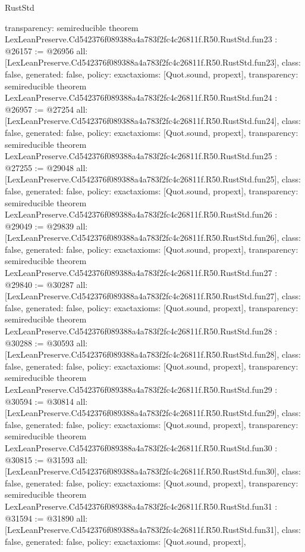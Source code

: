 \begin{lexlean}{RustStd}
\begin{coremodule}
{  transparency: semireducible
}
theorem LexLeanPreserve.Cd542376f089388a4a783f2fc4c26811f.R50.RustStd.fun23 : @26157 := @26956 {
  all: [LexLeanPreserve.Cd542376f089388a4a783f2fc4c26811f.R50.RustStd.fun23],
  class: false,
  generated: false,
  policy: exact{axioms: [Quot.sound, propext]},
  transparency: semireducible
}
theorem LexLeanPreserve.Cd542376f089388a4a783f2fc4c26811f.R50.RustStd.fun24 : @26957 := @27254 {
  all: [LexLeanPreserve.Cd542376f089388a4a783f2fc4c26811f.R50.RustStd.fun24],
  class: false,
  generated: false,
  policy: exact{axioms: [Quot.sound, propext]},
  transparency: semireducible
}
theorem LexLeanPreserve.Cd542376f089388a4a783f2fc4c26811f.R50.RustStd.fun25 : @27255 := @29048 {
  all: [LexLeanPreserve.Cd542376f089388a4a783f2fc4c26811f.R50.RustStd.fun25],
  class: false,
  generated: false,
  policy: exact{axioms: [Quot.sound, propext]},
  transparency: semireducible
}
theorem LexLeanPreserve.Cd542376f089388a4a783f2fc4c26811f.R50.RustStd.fun26 : @29049 := @29839 {
  all: [LexLeanPreserve.Cd542376f089388a4a783f2fc4c26811f.R50.RustStd.fun26],
  class: false,
  generated: false,
  policy: exact{axioms: [Quot.sound, propext]},
  transparency: semireducible
}
theorem LexLeanPreserve.Cd542376f089388a4a783f2fc4c26811f.R50.RustStd.fun27 : @29840 := @30287 {
  all: [LexLeanPreserve.Cd542376f089388a4a783f2fc4c26811f.R50.RustStd.fun27],
  class: false,
  generated: false,
  policy: exact{axioms: [Quot.sound, propext]},
  transparency: semireducible
}
theorem LexLeanPreserve.Cd542376f089388a4a783f2fc4c26811f.R50.RustStd.fun28 : @30288 := @30593 {
  all: [LexLeanPreserve.Cd542376f089388a4a783f2fc4c26811f.R50.RustStd.fun28],
  class: false,
  generated: false,
  policy: exact{axioms: [Quot.sound, propext]},
  transparency: semireducible
}
theorem LexLeanPreserve.Cd542376f089388a4a783f2fc4c26811f.R50.RustStd.fun29 : @30594 := @30814 {
  all: [LexLeanPreserve.Cd542376f089388a4a783f2fc4c26811f.R50.RustStd.fun29],
  class: false,
  generated: false,
  policy: exact{axioms: [Quot.sound, propext]},
  transparency: semireducible
}
theorem LexLeanPreserve.Cd542376f089388a4a783f2fc4c26811f.R50.RustStd.fun30 : @30815 := @31593 {
  all: [LexLeanPreserve.Cd542376f089388a4a783f2fc4c26811f.R50.RustStd.fun30],
  class: false,
  generated: false,
  policy: exact{axioms: [Quot.sound, propext]},
  transparency: semireducible
}
theorem LexLeanPreserve.Cd542376f089388a4a783f2fc4c26811f.R50.RustStd.fun31 : @31594 := @31890 {
  all: [LexLeanPreserve.Cd542376f089388a4a783f2fc4c26811f.R50.RustStd.fun31],
  class: false,
  generated: false,
  policy: exact{axioms: [Quot.sound, propext]},
}
\end{coremodule}
\end{lexlean}
